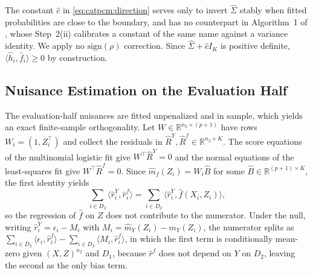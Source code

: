 \documentclass[twoside,11pt]{article}
\begin{document}
\begin{remark}
  \label{rem:catpcm:ridge}
  The constant $\hat{c}$ in \eqref{eq:catpcm:direction} serves only to invert $\hat{\Sigma}$ stably when fitted probabilities are close to the boundary, and has no counterpart in   Algorithm~1 of \citet{lundborg2024projected}, whose Step~2(ii) calibrates a constant of the   same name against a variance identity. We apply no $\mathrm{sign}(\rho)$ correction. Since   $\hat{\Sigma} + \hat{c}I_K$ is positive definite, $\langle \hat{h}_i, \hat{f}_i \rangle \geq 0$    by construction.
\end{remark}

\subsection{Nuisance Estimation on the Evaluation Half}
\label{app:catpcm:rates}

The evaluation-half nuisances are fitted unpenalized and in sample, which yields an exact finite-sample orthogonality. Let $W \in \mathbb{R}^{n_2 \times (p+1)}$ have rows $W_i = (1, Z_i^{\top})$ and collect the residuals in $\hat{R}^Y, \hat{R}^f \in \mathbb{R}^{n_2 \times K}$. The score equations of the multinomial logistic fit give $W^{\top}\hat{R}^Y = 0$ and the normal equations of the least-squares fit give $W^{\top}\hat{R}^f = 0$. Since $\hat{m}_f(Z_i) = W_i \hat{B}$ for some $\hat{B} \in \mathbb{R}^{(p+1) \times K}$, the first identity yields
\begin{equation}
  \label{eq:catpcm:orth}
  \sum_{i \in D_2} \langle \hat{r}^Y_i, \hat{r}^f_i \rangle = \sum_{i \in D_2} \langle \hat{r}^Y_i, \hat{f}(X_i,Z_i) \rangle,
\end{equation}
so the regression of $\hat{f}$ on $Z$ does not contribute to the numerator. Under the null, writing $\hat{r}^Y_i = \epsilon_i - M_i$ with $M_i = \hat{m}_Y(Z_i) - m_Y(Z_i)$, the numerator splits as $\sum_{i \in D_2} \langle \epsilon_i, \hat{r}^f_i \rangle - \sum_{i \in D_2} \langle M_i, \hat{r}^f_i \rangle$, in which the first term is conditionally mean-zero given $(X,Z)^{n_2}$ and $D_1$, because $\hat{r}^f$ does not depend on $Y$ on $D_2$, leaving the second as the only bias term.
\end{document}
